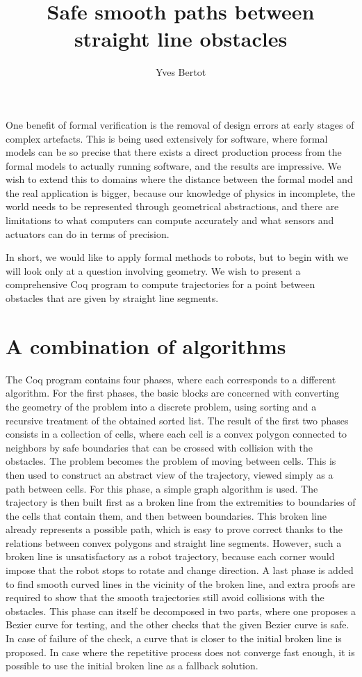 \documentclass{easychair}
\title{Safe smooth paths between straight line obstacles}
\author{Yves Bertot}
\institute{Inria Université Côte d'Azur}
\begin{document}
\maketitle

One benefit of formal verification is the removal of design errors at early
stages of complex artefacts.  This is being used extensively for software,
where formal models can be so precise that there exists a direct production
process from the formal models to actually running software, and the results
are impressive.  We wish to
extend this to domains where the distance between the formal model and the
real application is bigger, because our knowledge of physics in incomplete,
the world needs to be represented through geometrical abstractions, and
there are limitations to what computers can compute accurately and what
sensors and actuators can do in terms of precision.

In short, we would like to apply formal methods to robots, but to begin with
we will look only at a question involving geometry.  
We wish to present a comprehensive Coq program
to compute trajectories for a point between obstacles that are given by straight
line segments.

\section{A combination of algorithms}
The Coq program contains four phases, where each corresponds to a different
algorithm.  For the first phases, the basic blocks are concerned with
converting the geometry of the problem into a discrete problem, using sorting
and a recursive treatment of the obtained sorted list.  The result of the
first two phases consists in a collection of cells, where each cell is
a convex polygon connected to neighbors by safe boundaries that can
be crossed with collision with the obstacles.  The problem becomes the problem
of moving between cells. This
is then used to construct an abstract view of the trajectory, viewed simply
as a path between cells.  For this phase, a
simple graph algorithm is used.  The trajectory is
then built first as a broken line from the extremities to boundaries
of the cells that contain them, and then between boundaries.  This
broken line already represents a possible path, which is easy to prove correct
thanks to the relations between convex polygons and straight line segments.
However, such a broken line is unsatisfactory
as a robot trajectory, because each corner would impose that the robot
stops to rotate and change direction.  A last phase is added to find
smooth curved lines in the vicinity of the broken line, and extra proofs are
required to show that the smooth trajectories still avoid collisions with
the obstacles.  This phase can itself be decomposed in two parts, where one
proposes a Bezier curve for testing, and the other checks that the given
Bezier curve is safe.  In case of failure of the check, a curve that is closer
to the initial broken line is proposed.  In case where the repetitive process
does not converge fast enough, it is possible to use the initial broken line as
a fallback solution.
\end{document}

